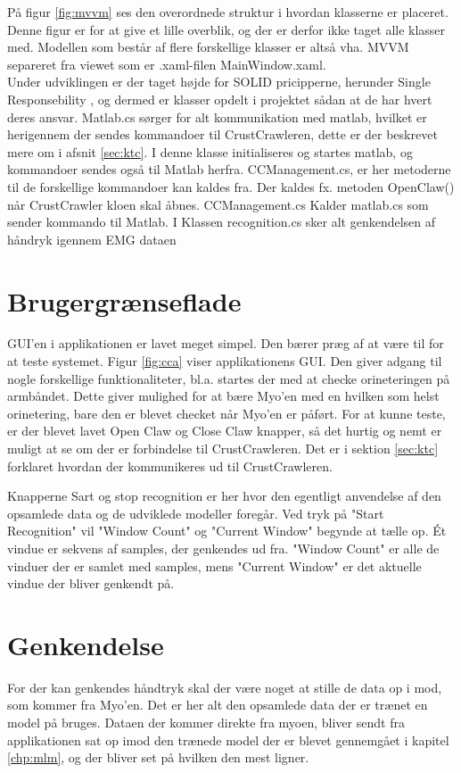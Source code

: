 På figur \ref{fig:mvvm} ses den overordnede struktur i hvordan klasserne er placeret. Denne figur er for at give et lille overblik, og der er derfor ikke taget alle klasser med. Modellen som består af flere forskellige klasser er altså vha. MVVM separeret fra viewet som er .xaml-filen MainWindow.xaml.\\
Under udviklingen er der taget højde for SOLID pricipperne, herunder Single Responsebility \cite{SingleRespons}, og dermed er klasser opdelt i projektet sådan at de har hvert deres ansvar. Matlab.cs sørger for alt kommunikation med matlab, hvilket er herigennem der sendes kommandoer til CrustCrawleren, dette er der beskrevet mere om i afsnit \ref{sec:ktc}. I denne klasse initialiseres og startes matlab, og kommandoer sendes også til Matlab herfra. CCManagement.cs, er her metoderne til de forskellige kommandoer kan kaldes fra. Der kaldes fx. metoden OpenClaw() når CrustCrawler kloen skal åbnes. CCManagement.cs Kalder matlab.cs som sender kommando til Matlab. I Klassen recognition.cs sker alt genkendelsen af håndryk igennem EMG dataen

\section{Brugergrænseflade}

GUI'en i applikationen er lavet meget simpel. Den bærer præg af at være til for at teste systemet. Figur \ref{fig:cca} viser applikationens GUI. Den giver adgang til nogle forskellige funktionaliteter, bl.a. startes der med at checke orineteringen på armbåndet. Dette giver mulighed for at bære Myo'en med en hvilken som helst orinetering, bare den er blevet checket når Myo'en er påført. For at kunne teste, er der blevet lavet Open Claw og Close Claw knapper, så det hurtig og nemt er muligt at se om der er forbindelse til CrustCrawleren. Det er i sektion \ref{sec:ktc} forklaret hvordan der kommunikeres ud til CrustCrawleren.

Knapperne Sart og stop recognition er her hvor den egentligt anvendelse af den opsamlede data og de udviklede modeller foregår. Ved tryk på "Start Recognition" vil "Window Count" og "Current Window" begynde at tælle op. Ét vindue er sekvens af samples, der genkendes ud fra. "Window Count" er alle de vinduer der er samlet med samples, mens "Current Window" er det aktuelle vindue der bliver genkendt på.

\section{Genkendelse}
For der kan genkendes håndtryk skal der være noget at stille de data op i mod, som kommer fra Myo'en. Det er her alt den opsamlede data der er trænet en model på bruges. Dataen der kommer direkte fra myoen, bliver sendt fra applikationen sat op imod den trænede model der er blevet gennemgået i kapitel \ref{chp:mlm}, og der bliver set på hvilken den mest ligner. 

